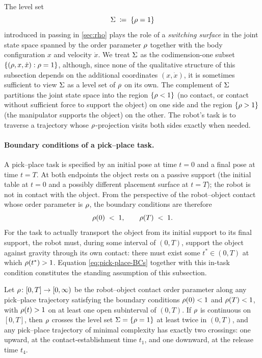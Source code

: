 The level set
\begin{equation}
\label{eq:Sigma-def}
  \Sigma \;\coloneqq\; \{\rho = 1\}
\end{equation}
introduced in passing in \cref{sec:rho} plays the role of a
\emph{switching surface} in the joint state space spanned by
the order parameter $\rho$ together with the body
configuration $x$ and velocity $\dot x$. We treat
$\Sigma$ as the codimension-one subset
$\{(\rho, x, \dot x) : \rho = 1\}$, although, since
none of the qualitative structure of this subsection depends on
the additional coordinates $(x, \dot x)$, it is sometimes
sufficient to view $\Sigma$ as a level set of $\rho$ on
its own. The complement of $\Sigma$ partitions the joint state
space into the region $\{\rho < 1\}$ (no contact, or contact
without sufficient force to support the object) on one side and
the region $\{\rho > 1\}$ (the manipulator supports the
object) on the other. The robot's task is to traverse a
trajectory whose
$\rho$-projection visits both sides exactly when needed.

\paragraph{Boundary conditions of a pick--place task.}
A pick--place task is specified by an initial pose at time $t =
0$ and a final pose at time $t = T$. At both endpoints the
object rests on a passive support (the initial table at $t = 0$
and a possibly different placement surface at $t = T$); the
robot is not in contact with the object. From the perspective
of the robot--object contact whose order parameter is
$\rho$, the boundary conditions are therefore
\begin{equation}
\label{eq:pick-place-BCs}
  \rho(0) \;<\; 1, \qquad \rho(T) \;<\; 1.
\end{equation}
For the task to actually transport the object from its initial
support to its final support, the robot must, during some
interval of $(0, T)$, support the object against gravity
through its own contact: there must exist some $t^{*} \in (0,
T)$ at which $\rho(t^{*}) > 1$. Equation
\eqref{eq:pick-place-BCs} together with this in-task condition
constitutes the standing assumption of this subsection.

\begin{lemma}\label{lem:two-crossing}
Let $\rho \colon [0, T] \to [0, \infty)$ be the
robot--object contact order parameter along any pick--place
trajectory satisfying the boundary conditions $\rho(0) <
1$ and $\rho(T) < 1$, with $\rho(t) > 1$ on at least
one open subinterval of $(0, T)$. If $\rho$ is continuous
on $[0, T]$, then $\rho$ crosses the level set $\Sigma =
\{\rho = 1\}$ at least twice in $(0, T)$, and any
pick--place trajectory of minimal complexity has exactly two
crossings: one upward, at the contact-establishment time
$t_{1}$, and one downward, at the release time $t_{4}$.
\end{lemma}

